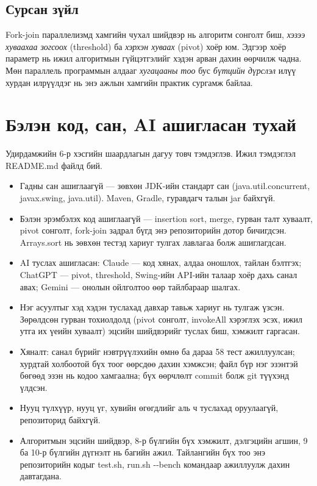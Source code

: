 \documentclass[11pt,a4paper]{article}
\begin{document}
\subsection{Сурсан зүйл}
Fork-join параллелизмд хамгийн чухал шийдвэр нь алгоритм сонголт биш,
\emph{хэзээ хуваахаа зогсоох} (threshold) ба \emph{хэрхэн хуваах} (pivot)
хоёр юм. Эдгээр хоёр параметр нь ижил алгоритмын гүйцэтгэлийг хэдэн арван
дахин өөрчилж чадна. Мөн параллель программын алдааг \emph{хугацааны тоо}
бус \emph{бүтцийн дүрслэл} илүү хурдан илрүүлдэг нь энэ ажлын хамгийн
практик сургамж байлаа.

\section{Бэлэн код, сан, AI ашигласан тухай}

Удирдамжийн 6-р хэсгийн шаардлагын дагуу товч тэмдэглэв. Ижил тэмдэглэл
README.md файлд бий.

\begin{itemize}[leftmargin=1.2em,itemsep=2pt]
  \item Гадны сан ашиглаагүй --- зөвхөн JDK-ийн стандарт сан
        (java.util.concurrent, javax.swing, java.util). Maven, Gradle,
        гуравдагч талын jar байхгүй.
  \item Бэлэн эрэмбэлэх код ашиглаагүй --- insertion sort, merge, гурван
        талт хуваалт, pivot сонголт, fork-join задрал бүгд энэ
        репозиторийн дотор бичигдсэн. Arrays.sort нь зөвхөн тестэд хариуг
        тулгах лавлагаа болж ашиглагдсан.
  \item AI туслах ашигласан: Claude --- код хянах, алдаа оношлох, тайлан
        бэлтгэх; ChatGPT --- pivot, threshold, Swing-ийн API-ийн талаар
        хоёр дахь санал авах; Gemini --- онолын ойлголтоо өөр
        тайлбараар шалгах.
  \item Нэг асуултыг хэд хэдэн туслахад давхар тавьж хариуг нь тулгаж
        үзсэн. Зөрөлдсөн гурван тохиолдолд (pivot сонголт, invokeAll
        хэрэглэх эсэх, ижил утга их үеийн хуваалт) эцсийн шийдвэрийг
        туслах биш, хэмжилт гаргасан.
  \item Хяналт: санал бүрийг нэвтрүүлэхийн өмнө ба дараа 58 тест
        ажиллуулсан; хурдтай холбоотой бүх тоог өөрсдөө дахин хэмжсэн;
        файл бүр нэг эзэнтэй бөгөөд эзэн нь кодоо хамгаална; бүх
        өөрчлөлт commit болж git түүхэнд үлдсэн.
  \item Нууц түлхүүр, нууц үг, хувийн өгөгдлийг аль ч туслахад
        оруулаагүй, репозиторид байхгүй.
  \item Алгоритмын эцсийн шийдвэр, 8-р бүлгийн бүх хэмжилт, дэлгэцийн
        агшин, 9 ба 10-р бүлгийн дүгнэлт нь багийн ажил. Тайлангийн бүх
        тоо энэ репозиторийн кодыг test.sh, run.sh -{}-bench командаар
        ажиллуулж дахин давтагдана.
\end{itemize}
\end{document}

